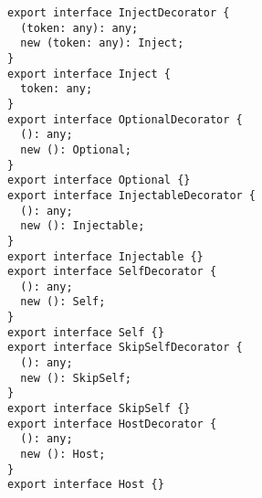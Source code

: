\begin{verbatim}
export interface InjectDecorator {
  (token: any): any;
  new (token: any): Inject;
}
export interface Inject {
  token: any;
}
export interface OptionalDecorator {
  (): any;
  new (): Optional;
}
export interface Optional {}
export interface InjectableDecorator {
  (): any;
  new (): Injectable;
}
export interface Injectable {}
export interface SelfDecorator {
  (): any;
  new (): Self;
}
export interface Self {}
export interface SkipSelfDecorator {
  (): any;
  new (): SkipSelf;
}
export interface SkipSelf {}
export interface HostDecorator {
  (): any;
  new (): Host;
}
export interface Host {}
\end{verbatim}
